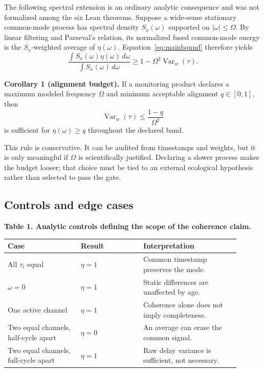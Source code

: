 \documentclass[10pt]{article}
\newcommand{\Var}{\operatorname{Var}}
\begin{document}
The following spectral extension is an ordinary analytic consequence and was
not formalized among the six Lean theorems.  Suppose a wide-sense stationary
common-mode process has spectral density
$S_x(\omega)$ supported on $|\omega|\le\Omega$.  By linear filtering and
Parseval's relation, its normalized fused common-mode energy is the
$S_x$-weighted average of $\eta(\omega)$.  Equation~\eqref{eq:mainbound}
therefore yields
\begin{equation}
\frac{\int S_x(\omega)\eta(\omega)\,d\omega}
{\int S_x(\omega)\,d\omega}
\ge 1-\Omega^2\Var_w(\tau).
\label{eq:spectral}
\end{equation}

\textbf{Corollary 1 (alignment budget).}  If a monitoring product declares a
maximum modeled frequency $\Omega$ and minimum acceptable alignment $q\in[0,1]$,
then
\begin{equation}
\boxed{\Var_w(\tau)\le\frac{1-q}{\Omega^2}}
\label{eq:budget}
\end{equation}
is sufficient for $\eta(\omega)\ge q$ throughout the declared band.

This rule is conservative.  It can be audited from timestamps and weights, but
it is only meaningful if $\Omega$ is scientifically justified.  Declaring a
slower process makes the budget looser; that choice must be tied to an external
ecological hypothesis rather than selected to pass the gate.

\subsection{Controls and edge cases}

\begin{center}
\small
\textbf{Table 1. Analytic controls defining the scope of the coherence claim.}\\[2pt]
\begin{tabular}{p{0.29\linewidth}p{0.24\linewidth}p{0.37\linewidth}}
\toprule
Case & Result & Interpretation \\
\midrule
All $\tau_i$ equal & $\eta=1$ & Common timestamp preserves the mode. \\
$\omega=0$ & $\eta=1$ & Static differences are unaffected by age. \\
One active channel & $\eta=1$ & Coherence alone does not imply completeness. \\
Two equal channels, half-cycle apart & $\eta=0$ & An average can erase the common signal. \\
Two equal channels, full-cycle apart & $\eta=1$ & Raw delay variance is sufficient, not necessary. \\
\bottomrule
\end{tabular}
\end{center}
\end{document}
